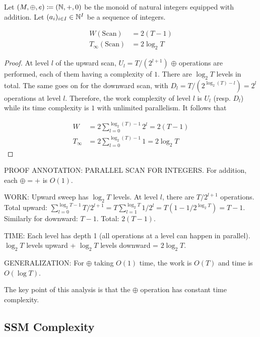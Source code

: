 \documentclass{article}
\begin{document}
\begin{proposition}
\label{prop:scan_integer_complexity}
    Let $(M, \oplus, e) \coloneqq (\mathbb{N}, +, 0)$ be the monoid of natural integers equipped with addition. Let $(a_i)_{i\in I}\in \mathbb{N}^I$ be a sequence of integers.

\begin{align}
    W(\mathrm{Scan})&= 2(T-1)\\
    T_\infty(\mathrm{Scan})&= 2\log_2 T
\end{align}
\end{proposition}

\begin{proof}
At level $l$ of the upward scan, $U_l = T/(2^{l+1})$ $\oplus$ operations are performed, each of them having a complexity of $1$. There are $\log_2 T$ levels in total. The same goes on for the downward scan, with $D_l = T/(2^{\log_2(T) - l})=2^{l}$ operations at level $l$. Therefore, the work complexity of level $l$ is $U_l$ (resp. $D_l$) while its time complexity is $1$ with unlimited parallelism. It follows that

\begin{align}
\label{eq:W_integer}
W &= 2\sum_{l=0}^{\log_2(T)-1}2^l=2(T-1)\\
\label{eq:T_integer}
T_\infty&= 2\sum_{l=0}^{\log_2(T)-1}1=2\log_2T
\end{align}
\end{proof}

\begin{thomasbox}
PROOF ANNOTATION: PARALLEL SCAN FOR INTEGERS. For addition, each $\oplus = +$ is $O(1)$.

WORK: Upward sweep has $\log_2 T$ levels. At level $l$, there are $T/2^{l+1}$ operations. Total upward: $\sum_{l=0}^{\log_2 T - 1} T/2^{l+1} = T \sum_{l=1}^{\log_2 T} 1/2^l = T(1 - 1/2^{\log_2 T}) = T - 1$. Similarly for downward: $T - 1$. Total: $2(T-1)$.

TIME: Each level has depth 1 (all operations at a level can happen in parallel). $\log_2 T$ levels upward + $\log_2 T$ levels downward = $2 \log_2 T$.

GENERALIZATION: For $\oplus$ taking $O(1)$ time, the work is $O(T)$ and time is $O(\log T)$.
\end{thomasbox}

The key point of this analysis is that the $\oplus$ operation has constant time complexity.

\subsection{SSM Complexity}
\label{app:SSM_complexity}
\end{document}
